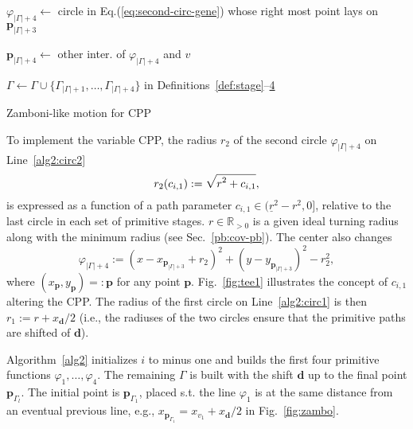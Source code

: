 \documentclass[letterpaper,10pt,conference,twoside]{IEEEtran}
\theoremstyle{definition}
\begin{document}
\begin{algorithm}[t]
\begin{algorithmic}[1]
          \STATE $\varphi_{|\Gamma|+4}\gets$ circle in Eq.\hspace*{.7ex}(\ref{eq:second-circ-gene}) 
          whose right most point\vspace*{.3ex} \hspace*{1em}lays on $\mathbf{p}_{|\Gamma|+3}$\vspace*{.3ex}\label{alg2:circ2}

          \STATE $\mathbf{p}_{|\Gamma|+4}\gets$ other inter. %
          of $\varphi_{|\Gamma|+4}$ and $v$\vspace*{.3ex}\label{alg2:trig4}

          \vspace*{.8ex}
          \STATE $\Gamma\gets\Gamma\cup\{\Gamma_{|\Gamma|+1},\dots,\Gamma_{|\Gamma|+4}\}${ in Definitions~\ref{def:stage}--\hyperref[def:plan]{4}}\label{alg2:last}

        \ENDIF
      \ENDIF
    \ENDFOR
  \end{algorithmic}
  \caption{Zamboni-like motion for CPP}\label{alg2}
\end{algorithm}

To implement the variable CPP, the radius $r_2$ of the second circle $\varphi_{|\Gamma|+4}$ on Line~\ref{alg2:circ2}
\vspace*{-1ex}
\begin{equation}\label{eq:r2}
  {\small r_2(c_{i,1}):=\sqrt{\smash[b]{r^2+c_{i,1}}},}
  \vspace*{-.4ex}
\end{equation}
is expressed as a function of a path parameter $c_{i,1}\in(\underline{r}^2-r^2,0]$, relative to the last circle in each set of primitive stages. $r\in\mathbb{R}_{>0}$ is a given ideal turning radius along with the minimum radius (see Sec.~\ref{pb:cov-pb}). The center also changes
\begin{equation}\label{eq:second-circ-gene}
  \varphi_{|\Gamma|+4}:=(x-x_{\mathbf{p}_{|\Gamma|+3}}+r_2)^2+(y-y_{\mathbf{p}_{|\Gamma|+3}})^2-r_2^2,
\end{equation}
where $(x_\mathbf{p},y_\mathbf{p})=:\mathbf{p}$ for any point $\mathbf{p}$. Fig.~\ref{fig:tee1} illustrates the concept of $c_{i,1}$ altering the CPP. The radius of the first circle on Line~\ref{alg2:circ1} is then $r_1:=r+x_\mathbf{d}/2$ (i.e., the radiuses of the two circles ensure that the primitive paths are shifted of $\mathbf{d}$).%

Algorithm~\ref{alg2} initializes $i$ to minus one and builds the first four primitive functions $\varphi_1,\dots,\varphi_4$. The remaining $\Gamma$ is built with the shift $\mathbf{d}$ up to the final point $\mathbf{p}_{\Gamma_l}$. The initial point is $\mathbf{p}_{\Gamma_1}$, placed s.t. the line $\varphi_1$ is at the same distance from an eventual previous line, e.g., $x_{\mathbf{p}_{\Gamma_1}}=x_{v_1}+x_{\mathbf{d}}/2$ in Fig.~\ref{fig:zambo}.
\end{document}
